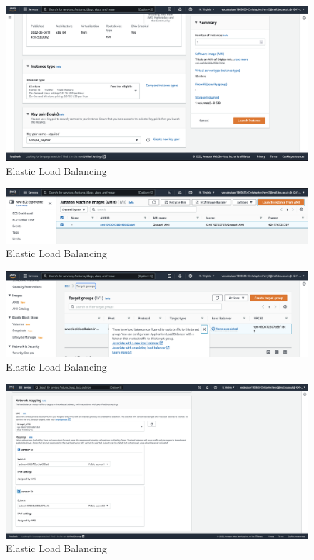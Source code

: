 \begin{figure}[!htbp]
    \centering
    \includegraphics[width=\textwidth]{resources/elb/elb-instance-2-type-and-keypair.png}
    \caption{Elastic Load Balancing}
    \label{fig:elb-type-and-keypair}
\end{figure}
\begin{figure}[!htbp]
    \centering
    \includegraphics[width=\textwidth]{resources/elb/elb-instance-from-ami.png}
    \caption{Elastic Load Balancing}
    \label{fig:elb-instance-from-ami}
\end{figure}
\begin{figure}[!htbp]
    \centering
    \includegraphics[width=\textwidth]{resources/elb/elb-load-balancer-creation.png}
    \caption{Elastic Load Balancing}
    \label{fig:elb-load-bal-create}
\end{figure}
\begin{figure}[!htbp]
    \centering
    \includegraphics[width=\textwidth]{resources/elb/elb-network-mapping.png}
    \caption{Elastic Load Balancing}
    \label{fig:elb-networ-mapping}
\end{figure}
